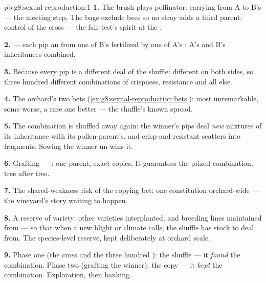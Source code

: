 \begin{solution}{pb:g8:sexual-reproduction:1}
\textbf{1.} The brush plays pollinator: carrying 
 from A to B's  --- the meeting step. The
bags exclude bees so no stray  adds a third parent:
control of the cross --- the fair test's spirit at the
.

\textbf{2.}  --- each pip an  from one of B's
 fertilized by one of A's  : A's and
B's inheritances combined.

\textbf{3.} Because every pip is a different deal of the
shuffle: different  on both sides, so three hundred
different combinations of crispness, resistance and all
else.

\textbf{4.} The orchard's two bets
(\cref{ex:g8:sexual-reproduction:bets}): most 
unremarkable, some worse, a rare one better --- the
shuffle's known spread.

\textbf{5.} The combination is shuffled away again: the
winner's pips deal \emph{new} mixtures of its inheritance
with its pollen-parent's, and crisp-and-resistant scatters
into fragments. Sowing the winner un-wins it.

\textbf{6.} Grafting --- : one
parent, exact copies. It guarantees the prized
combination, tree after tree.

\textbf{7.} The shared-weakness risk of the copying bet:
one constitution orchard-wide --- the vineyard's story
waiting to happen.

\textbf{8.} A reserve of variety: other varieties
interplanted, and breeding lines maintained from  ---
so that when a new blight or climate calls, the shuffle
has stock to deal from. The species-level reserve, kept
deliberately at orchard scale.

\textbf{9.} Phase one (the cross and the three hundred
): the shuffle --- it \emph{found} the
combination. Phase two (grafting the winner): the copy ---
it \emph{kept} the combination. Exploration, then
banking.


\end{solution}
